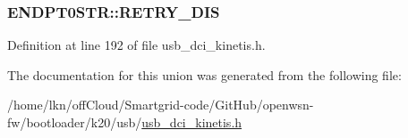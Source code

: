 \subsubsection[{\texorpdfstring{R\+E\+T\+R\+Y\+\_\+\+D\+IS}{RETRY_DIS}}]{ E\+N\+D\+P\+T0\+S\+T\+R\+::\+R\+E\+T\+R\+Y\+\_\+\+D\+IS}\hypertarget{union_e_n_d_p_t0_s_t_r_a31bc8732c15885a90a5785d6811c6383}{}\label{union_e_n_d_p_t0_s_t_r_a31bc8732c15885a90a5785d6811c6383}


Definition at line 192 of file usb\+\_\+dci\+\_\+kinetis.\+h.



The documentation for this union was generated from the following file\+:\begin{DoxyCompactItemize}
\item 
/home/lkn/off\+Cloud/\+Smartgrid-\/code/\+Git\+Hub/openwsn-\/fw/bootloader/k20/usb/\hyperlink{usb__dci__kinetis_8h}{usb\+\_\+dci\+\_\+kinetis.\+h}\end{DoxyCompactItemize}
